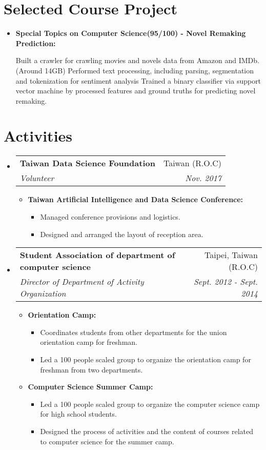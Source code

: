 \documentclass[letterpaper,11pt]{article}
\makeatletter
\newcommand{\resumeItem}[2]{
	\item{
		\vspace{-2pt}
    	\textbf{#1: \\}
		\vspace{-2pt} 
		\begin{itemize} 
            #2
		\end{itemize}
	}
}
\newcommand{\resumeItemDetail}[1]
{
    \item \small{ #1 \vspace{-2pt} }
}
\newcommand{\resumeSubheading}[4]{
  \vspace{-1pt}\item
    \begin{tabular*}{0.97\textwidth}{l@{\extracolsep{\fill}}r}
      \textbf{#1} & #2 \\
      \textit{\small#3} & \textit{\small #4} \\
    \end{tabular*}\vspace{-5pt}
}
\newcommand{\resumeSubHeadingListStart}{\begin{itemize}[label={},leftmargin=*]}
\newcommand{\resumeSubHeadingListEnd}{\end{itemize}}
\newcommand{\resumeItemListStart}{\begin{itemize}}
\newcommand{\resumeItemListEnd}{\end{itemize}\vspace{-5pt}}
\makeatother
\begin{document}
\section{Selected Course Project}
  \resumeSubHeadingListStart
    \resumeItem{Special Topics on Computer Science(95/100) - Novel Remaking Prediction}
    {
        {Built a crawler for crawling movies and novels data from Amazon and IMDb. (Around 14GB)}
	    {Performed text processing, including parsing, segmentation and tokenization for sentiment analysis}
	    {Trained a binary classifier via support vector machine by processed features and ground truths for predicting novel remaking.}
    }
  \resumeSubHeadingListEnd

\section{Activities}
  \resumeSubHeadingListStart
	\resumeSubheading
		{Taiwan Data Science Foundation}{Taiwan (R.O.C)}
		{Volunteer}{Nov. 2017}
      \resumeItemListStart
		\resumeItem{Taiwan Artificial Intelligence and Data Science Conference}
        {
		    \resumeItemDetail{Managed conference provisions and logistics.}
		    \resumeItemDetail{Designed and arranged the layout of reception area.}
        }
      \resumeItemListEnd
    \resumeSubheading
      {Student Association of department of computer science}{Taipei, Taiwan (R.O.C)}
      {Director of Department of Activity Organization}{Sept. 2012 - Sept. 2014}
      \resumeItemListStart
        \resumeItem{Orientation Camp}
        {
            \resumeItemDetail{Coordinates students from other departments for the union orientation camp for freshman.}
		    \resumeItemDetail{Led a 100 people scaled group to organize the orientation camp for freshman from two departments.}
        }
		\resumeItem{Computer Science Summer Camp}
        {
		    \resumeItemDetail{Led a 100 people scaled group to organize the computer science camp for high school students.}
		    \resumeItemDetail{Designed the process of activities and the content of courses related to computer science for the summer camp.}
        }
      \resumeItemListEnd
  \resumeSubHeadingListEnd
\end{document}
